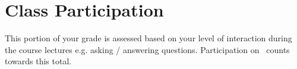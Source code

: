 \section*{Class Participation}

This portion of your grade is assessed based on your level of interaction during the course lectures e.g. asking / answering questions. Participation on \slacklink~counts towards this total.